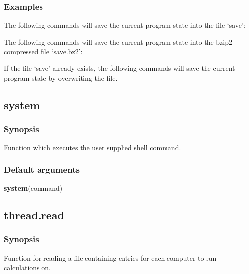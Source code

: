 \subsubsection{Examples}

The following commands will save the current program state into the file `save':



The following commands will save the current program state into the bzip2 compressed file
`save.bz2':



If the file `save' already exists, the following commands will save the current program
state by overwriting the file.




\newpage

\subsection{system}


\subsubsection{Synopsis}

Function which executes the user supplied shell command.

\subsubsection{Default arguments}

\textsf{\textbf{system}(command)}



\newpage

\subsection{thread.read}


\subsubsection{Synopsis}

Function for reading a file containing entries for each computer to run calculations on.

